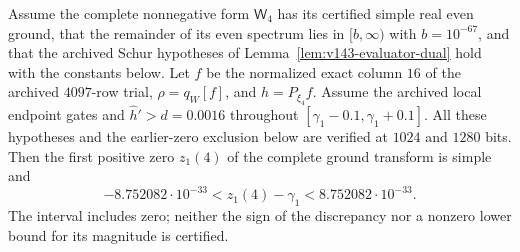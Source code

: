 \begin{proposition}
\label{prop:v143-first-zero-bound}
Assume the complete nonnegative form $\mathsf W_4$ has its certified simple
real even ground, that the remainder of its even spectrum lies in
$[b,\infty)$ with $b=10^{-67}$, and that the archived Schur hypotheses
of Lemma~\ref{lem:v143-evaluator-dual} hold with the constants below.
Let $f$ be the normalized exact column $16$ of the archived $4097$-row
trial, $\rho=q_W[f]$, and $h=P_{\xi_4}f$. Assume the archived local
endpoint gates and $\widehat h'>d=0.0016$ throughout
$[\gamma_1-0.1,\gamma_1+0.1]$. All these hypotheses and the earlier-zero
exclusion below are verified at $1024$ and $1280$ bits.
Then the first positive zero $z_1(4)$ of the complete ground transform
is simple and
\begin{equation}\label{eq:v143-first-zero-absolute}
 -8.752082\cdot10^{-33}<z_1(4)-\gamma_1<8.752082\cdot10^{-33}.
\end{equation}
The interval includes zero; neither the sign of the discrepancy nor
a nonzero lower bound for its magnitude is certified.
\end{proposition}
